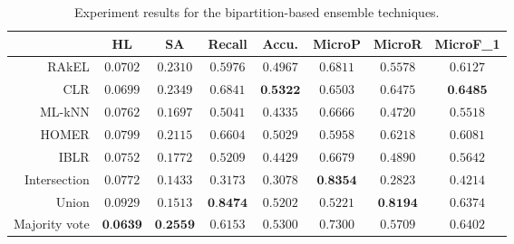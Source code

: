 \begin{table*}[ht]
	\begin{center}
	\label{tab:bipartition-table}
		\begin{tabular}{rccccccc}
		\toprule
			 & HL & SA & Recall & Accu. & MicroP & MicroR & MicroF_1\\
			\midrule
			RAkEL & $0.0702$ & $0.2310$ & $0.5976$ & $0.4967$ & $0.6811$ & $0.5578$ & $0.6127$\\
			CLR & $0.0699$ & $0.2349$ & $0.6841$ & $\textbf{0.5322}$ & $0.6503$ & $0.6475$ & $\textbf{0.6485}$\\
			ML-kNN & $0.0762$ & $0.1697$ & $0.5041$ & $0.4335$ & $0.6666$ & $0.4720$ & $0.5518$\\
			HOMER & $0.0799$ & $0.2115$ & $0.6604$ & $0.5029$ & $0.5958$ & $0.6218$ & $0.6081$\\
			IBLR & $0.0752$ & $0.1772$ & $0.5209$ & $0.4429$ & $0.6679$ & $0.4890$ & $0.5642$\\
			Intersection & $0.0772$ & $0.1433$ & $0.3173$ & $0.3078$ & $\textbf{0.8354}$ & $0.2823$ & $0.4214$\\
			Union & $0.0929$ & $0.1513$ & $\textbf{0.8474}$ & $0.5202$ & $0.5221$ & $\textbf{0.8194}$ & $0.6374$\\
			Majority vote & $\textbf{0.0639}$ & $\textbf{0.2559}$ & $0.6153$ & $0.5300$ & $0.7300$ & $0.5709$ & $0.6402$\\
		\bottomrule
		\end{tabular}
                \caption{Experiment results for the bipartition-based ensemble techniques.}
	\end{center}
\end{table*}
